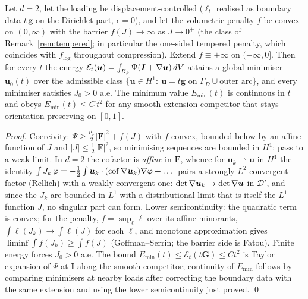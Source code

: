 \begin{lemma}
    \label{lem:fundexist}
    Let $d=2$, let the loading be displacement-controlled ($\ell_t$ realised as boundary data $t\,\bm g$ on the
    Dirichlet part, $\epsilon=0$), and let the volumetric penalty $f$ be convex on $(0,\infty)$ with the barrier
    $f(J)\to\infty$ as $J\to0^+$ (the class of Remark~\ref{rem:tempered}; in particular the one-sided tempered
    penalty, which coincides with $f_{\log}$ throughout compression). Extend $f\equiv+\infty$ on $(-\infty,0]$. Then
    for every $t$ the energy $\mathcal E_t(\bm u)=\int_{B_\rho}\Psi(\bm I+\nabla\bm u)\,dV$ attains a global minimiser
    $\bm u_0(t)$ over the admissible class $\{\bm u\in H^1:\ \bm u=t\bm g \text{ on } \Gamma_D\cup\text{outer arc}\}$,
    and every minimiser satisfies $J_0>0$ a.e. The minimum value $E_{\min}(t)$ is continuous in $t$ and obeys
    $E_{\min}(t)\le C\,t^2$ for any smooth extension competitor that stays orientation-preserving on $[0,1]$.
\end{lemma}

\begin{proof}
    Coercivity: $\Psi\ge\tfrac{\mu_e}{2}|\bm F|^2+f(J)$ with $f$ convex, bounded below by an affine function of $J$
    and $|J|\le\tfrac12|\bm F|^2$, so minimising sequences are bounded in $H^1$; pass to a weak limit. In $d=2$ the
    cofactor is \emph{affine} in $\bm F$, whence for $\bm u_k\rightharpoonup\bm u$ in $H^1$ the identity
    $\int J_k\,\varphi=-\tfrac12\int \bm u_k\cdot(\operatorname{cof}\nabla\bm u_k)\nabla\varphi+\dots$ pairs a strongly
    $L^2$-convergent factor (Rellich) with a weakly convergent one: $\det\nabla\bm u_k\to\det\nabla\bm u$ in
    $\mathcal D'$, and since the $J_k$ are bounded in $L^1$ with a distributional limit that is itself the $L^1$
    function $J$, no singular part can form. Lower semicontinuity: the quadratic term is convex; for the penalty,
    $f=\sup_\ell \ell$ over its affine minorants, $\int \ell(J_k)\to\int \ell(J)$ for each $\ell$, and monotone
    approximation gives $\liminf\int f(J_k)\ge\int f(J)$ (Goffman--Serrin; the barrier side is Fatou). Finite energy
    forces $J_0>0$ a.e. The bound $E_{\min}(t)\le\mathcal E_t(t\bm G)\le Ct^2$ is Taylor expansion of $\Psi$ at
    $\bm I$ along the smooth competitor; continuity of $E_{\min}$ follows by comparing minimisers at nearby loads
    after correcting the boundary data with the same extension and using the lower semicontinuity just proved. \qed
\end{proof}


